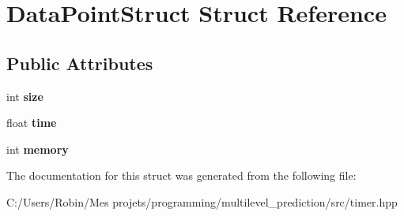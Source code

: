 \hypertarget{struct_data_point_struct}{}\section{Data\+Point\+Struct Struct Reference}
\label{struct_data_point_struct}
\subsection*{Public Attributes}
\begin{DoxyCompactItemize}
\item 
\hypertarget{struct_data_point_struct_ac42ecde939c4bb686fbe3ce67d5c34e3}{}int {\bfseries size}\label{struct_data_point_struct_ac42ecde939c4bb686fbe3ce67d5c34e3}

\item 
\hypertarget{struct_data_point_struct_ae1dae54ff363ef8a6d946907b1621506}{}float {\bfseries time}\label{struct_data_point_struct_ae1dae54ff363ef8a6d946907b1621506}

\item 
\hypertarget{struct_data_point_struct_a6d345b8aa7e79cd06402446d73d19520}{}int {\bfseries memory}\label{struct_data_point_struct_a6d345b8aa7e79cd06402446d73d19520}

\end{DoxyCompactItemize}


The documentation for this struct was generated from the following file\+:\begin{DoxyCompactItemize}
\item 
C\+:/\+Users/\+Robin/\+Mes projets/programming/multilevel\+\_\+prediction/src/timer.\+hpp\end{DoxyCompactItemize}
